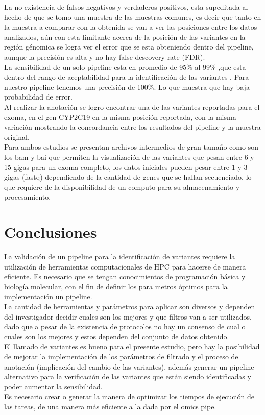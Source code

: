 La no existencia de falsos negativos y verdaderos positivos, esta supeditada al hecho de que se tomo una muestra de las muestras comunes, es decir que tanto en la muestra a comparar con la obtenida se van a ver las posiciones entre los datos analizados, aún con esta limitante acerca de la posición de las variantes en la región génomica se logra ver el error que se esta obteniendo dentro del pipeline, aunque la precisión es alta y no hay false descovery rate (FDR).\\

La sensibilidad de un solo pipeline esta en promedio de 95\% al 99\% ,que esta dentro del rango de aceptabilidad para la identificación de las variantes \cite{Liu2013}. Para nuestro pipeline tenemos una precisión de 100\%. Lo que muestra que hay baja probabilidad de error.\\

Al realizar la anotación se logro encontrar una de las variantes reportadas para el exoma, en el gen CYP2C19 en la misma posición reportada, con la misma variación mostrando la concordancia entre los resultados del pipeline y la muestra original. \\

Para ambos estudios se presentan archivos intermedios de gran tamaño como son los bam y bai que permiten la visualización de las variantes que pesan entre 6 y 15 gigas para un exoma completo, los datos iniciales pueden pesar entre 1 y 3 gigas (fastq) dependiendo de la cantidad de genes que se hallan secuenciado, lo que requiere de la disponibilidad de un computo para su almacenamiento y procesamiento. 

\section{Conclusiones}

La validación de un pipeline para la identificación de variantes requiere la utilización de herramientas computacionales de HPC para hacerse de manera eficiente. Es necesario que se tengan conocimientos de programación básica y biología molecular, con el fin de definir los para metros óptimos para la implementación un pipeline.\\ 

La cantidad de herramientas y parámetros para aplicar son diversos y dependen del investigador decidir cuales son los mejores y que filtros van a ser utilizados, dado que a pesar de la existencia de protocolos no hay un consenso de cual o cuales son los mejores y estos dependen del conjunto de datos obtenido. \\ 

El llamado de variantes es bueno para el presente estudio, pero hay la posibilidad de mejorar la implementación de los parámetros de filtrado y el proceso de anotación (implicación del cambio de las variantes), además generar un pipeline alternativo para la verificación de las variantes que están siendo identificadas y poder aumentar la sensibilidad. \\

Es necesario crear o generar la manera de optimizar los tiempos de ejecución de las tareas, de una manera más eficiente a la dada por el omics pipe.\\ 
